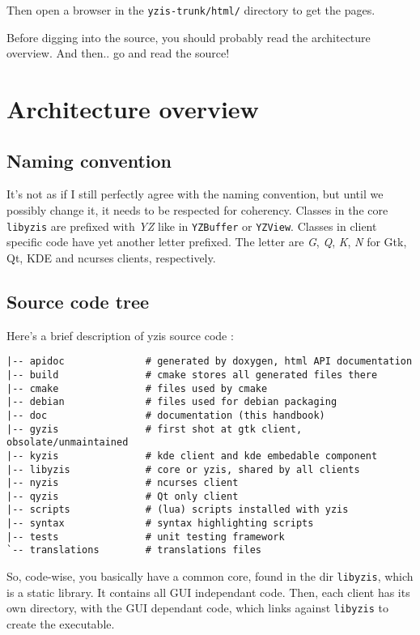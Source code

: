 \documentclass[a4paper,12pt]{report}
\begin{document}
Then open a browser in the \verb+yzis-trunk/html/+ directory to get the
pages.

Before digging into the source, you should probably read the architecture
overview. And then.. go and read the source!

\chapter{Architecture overview}

\section{Naming convention}
It's not as if I still perfectly agree with the naming convention, but
until we possibly change it, it needs to be respected for coherency.
Classes in the core \verb+libyzis+ are prefixed with \emph{YZ} like in 
\verb+YZBuffer+ or \verb+YZView+.
Classes in client specific code have yet another letter prefixed. The
letter are \emph{G}, \emph{Q}, \emph{K}, \emph{N} for Gtk, Qt, KDE
and ncurses clients, respectively.

\section{Source code tree}
Here's a brief description of yzis source code :
\begin{verbatim}
|-- apidoc              # generated by doxygen, html API documentation
|-- build               # cmake stores all generated files there
|-- cmake               # files used by cmake
|-- debian              # files used for debian packaging
|-- doc                 # documentation (this handbook)
|-- gyzis               # first shot at gtk client, obsolate/unmaintained
|-- kyzis               # kde client and kde embedable component
|-- libyzis             # core or yzis, shared by all clients
|-- nyzis               # ncurses client
|-- qyzis               # Qt only client
|-- scripts             # (lua) scripts installed with yzis
|-- syntax              # syntax highlighting scripts
|-- tests               # unit testing framework
`-- translations        # translations files
\end{verbatim}

So, code-wise, you basically have a common core, found in the dir
\verb+libyzis+, which is a static library. It contains all GUI independant
code. Then, each client has its own directory, with the GUI dependant code,
which links against \verb+libyzis+ to create the executable.
\end{document}
